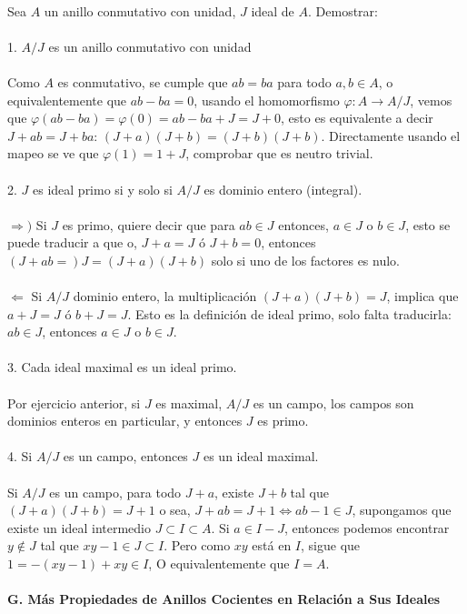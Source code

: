 \documentclass{article}
\begin{document}
\\
Sea $A$ un anillo conmutativo con unidad, $J$ ideal de $A$. Demostrar:
\\
\\
1. $A/J$ es un anillo conmutativo con unidad
\\
\\
Como $A$ es conmutativo, se cumple que $ab=ba$ para todo $a,b \in A$, o equivalentemente que $ab-ba=0$, usando el homomorfismo $\varphi: A \to A/J$, vemos que $\varphi(ab-ba)=\varphi(0)=ab-ba+J=J+0$, esto es equivalente a decir $J+ab=J+ba$: $(J+a)(J+b)=(J+b)(J+b)$. Directamente usando el mapeo se ve que $\varphi(1)=1+J$, comprobar que es neutro trivial.
\\
\\
2. $J$ es ideal primo si y solo si $A/J$ es dominio entero (integral).
\\
\\
$\Longrightarrow)$ Si $J$ es primo, quiere decir que para $ab \in J$ entonces, $a \in J$ o $b \in J$, esto se puede traducir a que o, $J+a=J$ ó $J+b=0$, entonces $(J+ab=)J=(J+a)(J+b)$ solo si uno de los factores es nulo.
\\
\\
$\Longleftarrow$ Si $A/J$ dominio entero, la multiplicación $(J+a)(J+b)=J$, implica que $a+J=J$ ó $b+J=J$. Esto es la definición de ideal primo, solo falta traducirla: $ab \in J$, entonces $a \in J$ o $b \in J$.
\\
\\
3. Cada ideal maximal es un ideal primo.
\\
\\
Por ejercicio anterior, si $J$ es maximal, $A/J$ es un campo, los campos son dominios enteros en particular, y entonces $J$ es primo.
\\
\\
4. Si $A/J$ es un campo, entonces $J$ es un ideal maximal.
\\
\\
Si $A/J$ es un campo, para todo $J+a$, existe $J+b$ tal que $(J+a)(J+b)=J+1$ o sea, $J+ab=J+1 \Longleftrightarrow ab-1 \in J$, supongamos que existe un ideal intermedio $J \subset I \subset A$. Si $a \in I-J$, entonces podemos encontrar $y \notin J$ tal que $xy-1 \in J \subset I$. Pero como $xy$ está en $I$, sigue que $1=-(xy-1)+xy \in I$, O equivalentemente que $I=A$.
\\
\\
\textbf{G. Más Propiedades de Anillos Cocientes en Relación a Sus Ideales}
\\
\end{document}
